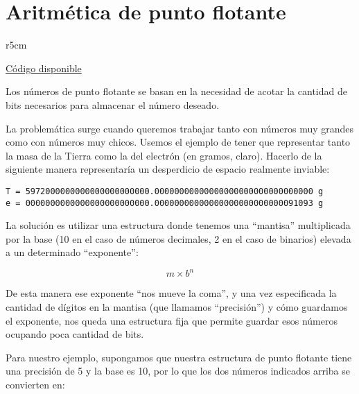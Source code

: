 

\chapter{Aritmética de punto flotante} \label{ch:puntoflotante}
 
\begin{wraptable}{r}{5cm}
\begin{modulesinfo}
\begin{center}
{\small
    \href{https://github.com/facundobatista/libro-pyciencia/tree/master/código/punto_flotante/}{Código disponible}
}
\end{center}
\end{modulesinfo}
\end{wraptable}


Los números de punto flotante se basan en la necesidad de acotar la cantidad de bits necesarios para almacenar el número deseado.

La problemática surge cuando queremos trabajar tanto con números muy grandes como con números muy chicos. Usemos el ejemplo de tener que representar tanto la masa de la Tierra como la del electrón (en gramos, claro). Hacerlo de la siguiente manera representaría un desperdicio de espacio realmente inviable:

\begin{verbatim}
T = 5972000000000000000000000.00000000000000000000000000000000 g
e = 0000000000000000000000000.00000000000000000000000000091093 g
\end{verbatim}

La solución es utilizar una estructura donde tenemos una ``mantisa'' multiplicada por la base (10 en el caso de números decimales, 2 en el caso de binarios) elevada a un determinado ``exponente'':

\begin{equation*}
m \times b^{n}
\end{equation*}

De esta manera ese exponente ``nos mueve la coma'', y una vez especificada la cantidad de dígitos en la mantisa (que llamamos ``precisión'') y cómo guardamos el exponente, nos queda una estructura fija que permite guardar esos números ocupando poca cantidad de bits.

Para nuestro ejemplo, supongamos que nuestra estructura de punto flotante tiene una precisión de 5 y la base es 10, por lo que los dos números indicados arriba se convierten en:

